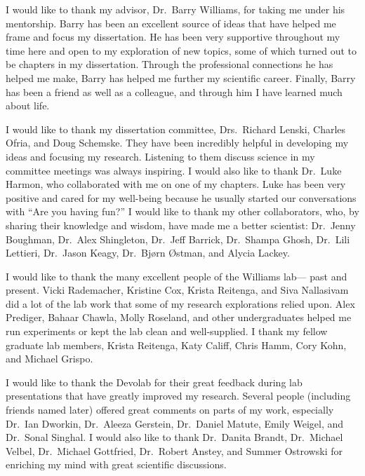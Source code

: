 \begin{acknowledgment}

I would like to thank my advisor, Dr.~Barry Williams,
for taking me under his mentorship.
%
Barry has been an excellent source of ideas
that have helped me frame and focus my dissertation.
%
He has been very supportive throughout my time here
and open to my exploration of new topics,
some of which turned out to be chapters in my dissertation.
%
Through the professional connections he has helped me make,
Barry has helped me further my scientific career.
%
Finally, Barry has been a friend as well as a colleague,
and through him I have learned much about life.



I would like to thank my dissertation committee,
Drs.~Richard Lenski, Charles Ofria, and Doug Schemske.
%
They have been incredibly helpful
in developing my ideas and focusing my research.
%
Listening to them discuss science in my committee meetings was always inspiring.
%
I would also like to thank Dr.~Luke Harmon,
who collaborated with me on one of my chapters.
%
Luke has been very positive and cared for my well-being
because he usually started our conversations with ``Are you having fun?''
%
I would like to thank my other collaborators,
who, by sharing their knowledge and wisdom,
have made me a better scientist:
Dr.~Jenny Boughman, Dr.~Alex Shingleton, Dr.~Jeff Barrick,
Dr.~Shampa Ghosh, Dr.~Lili Lettieri, Dr.~Jason Keagy,
Dr.~Bj\o rn \O stman, and Alycia Lackey.



I would like to thank the many excellent people of the Williams lab---%
past and present.
%
Vicki Rademacher, Kristine Cox, Krista Reitenga, and Siva Nallasivam
did a lot of the lab work that some of my research explorations relied upon.
%
Alex Prediger, Bahaar Chawla, Molly Roseland, and other undergraduates
helped me run experiments or kept the lab clean and well-supplied.
%
I thank my fellow graduate lab members, Krista Reitenga, Katy Califf,
Chris Hamm, Cory Kohn, and Michael Grispo.



I would like to thank the Devolab for their great feedback
during lab presentations that have greatly improved my research.
%
Several people (including friends named later) offered great comments
on parts of my work, especially Dr.~Ian Dworkin, Dr.~Aleeza Gerstein,
Dr.~Daniel Matute, Emily Weigel, and Dr.~Sonal Singhal.
%
I would also like to thank Dr.~Danita Brandt, Dr.~Michael Velbel,
Dr.~Michael Gottfried, Dr.~Robert Anstey, and Summer Ostrowski
for enriching my mind with great scientific discussions.




\end{acknowledgment}
